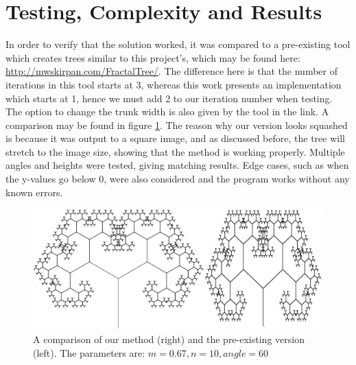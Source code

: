 \section{Testing, Complexity and Results} \label{results}
In order to verify that the solution worked, it was compared to a pre-existing tool which creates trees  similar to this project's, which may be found here: \url{http://mwskirpan.com/FractalTree/}. The difference here is that the number of iterations in this tool starts at 3, whereas this work presents an implementation which starts at 1, hence we must add 2 to our iteration number when testing. The option to change the trunk width is also given by the tool in the link. A comparison may be found in figure \ref{fig:comparison}. The reason why our version looks squashed is because it was output to a square image, and as discussed before, the tree will stretch to the image size, showing that the method is working properly. Multiple angles and heights were tested, giving matching results. Edge cases, such as when the y-values go below 0, were also considered and the program works without any known errors.

\begin{figure}
	\includegraphics[width=\linewidth]{Images/Comparison.png}
	\centering
	\caption{A comparison of our method (right) and the pre-existing version (left). The parameters are: $m=0.67, n=10, angle=60$}
	\label{fig:comparison}
\end{figure}

